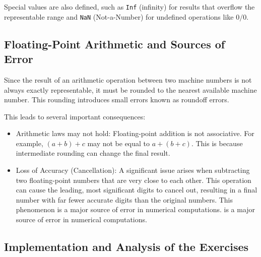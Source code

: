 Special values are also defined, such as \verb|Inf| (infinity) for results that overflow the representable range and \verb|NaN| (Not-a-Number) for undefined operations like $0/0$.

\subsection{Floating-Point Arithmetic and Sources of Error}
Since the result of an arithmetic operation between two machine numbers is not always exactly representable, it must be rounded to the nearest available machine number. This rounding introduces small errors known as roundoff errors.

This leads to several important consequences:
\begin{itemize}
    \item Arithmetic laws may not hold: Floating-point addition is not associative. For example, $(a + b) + c$ may not be equal to $a + (b + c)$. This is because intermediate rounding can change the final result.
    \item Loss of Accuracy (Cancellation): A significant issue arises when subtracting two floating-point numbers that are very close to each other. This operation can cause the leading, most significant digits to cancel out, resulting in a final number with far fewer accurate digits than the original numbers. This phenomenon is a major source of error in numerical computations. is a major source of error in numerical computations.
\end{itemize}


\subsection{Implementation and Analysis of the Exercises}

